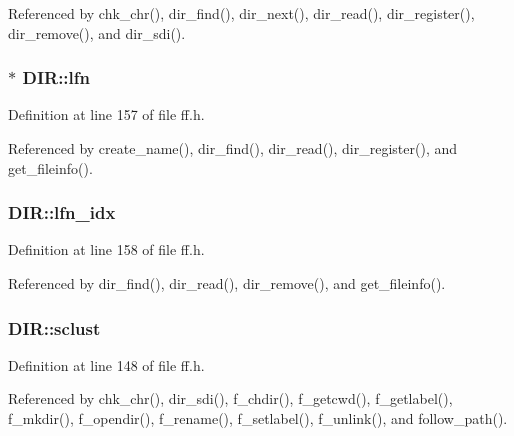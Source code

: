Referenced by chk\+\_\+chr(), dir\+\_\+find(), dir\+\_\+next(), dir\+\_\+read(), dir\+\_\+register(), dir\+\_\+remove(), and dir\+\_\+sdi().

\subsubsection[{\texorpdfstring{lfn}{lfn}}]{$\ast$ D\+I\+R\+::lfn}\hypertarget{structDIR_af62fd789383e6f1397f74617e11c135d}{}\label{structDIR_af62fd789383e6f1397f74617e11c135d}


Definition at line 157 of file ff.\+h.



Referenced by create\+\_\+name(), dir\+\_\+find(), dir\+\_\+read(), dir\+\_\+register(), and get\+\_\+fileinfo().

\subsubsection[{\texorpdfstring{lfn\+\_\+idx}{lfn_idx}}]{ D\+I\+R\+::lfn\+\_\+idx}\hypertarget{structDIR_acad41b18758c9278c14d47076e8149fc}{}\label{structDIR_acad41b18758c9278c14d47076e8149fc}


Definition at line 158 of file ff.\+h.



Referenced by dir\+\_\+find(), dir\+\_\+read(), dir\+\_\+remove(), and get\+\_\+fileinfo().

\subsubsection[{\texorpdfstring{sclust}{sclust}}]{ D\+I\+R\+::sclust}\hypertarget{structDIR_a9212af5877b94d790dd3bab3aa320994}{}\label{structDIR_a9212af5877b94d790dd3bab3aa320994}


Definition at line 148 of file ff.\+h.



Referenced by chk\+\_\+chr(), dir\+\_\+sdi(), f\+\_\+chdir(), f\+\_\+getcwd(), f\+\_\+getlabel(), f\+\_\+mkdir(), f\+\_\+opendir(), f\+\_\+rename(), f\+\_\+setlabel(), f\+\_\+unlink(), and follow\+\_\+path().

